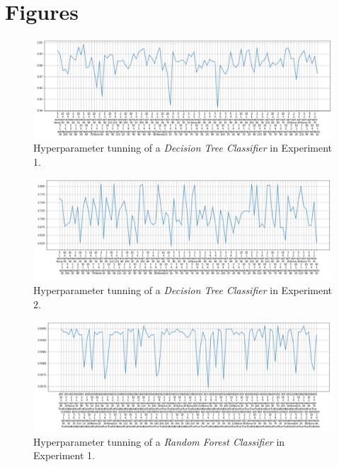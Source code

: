 \documentclass[sigplan,screen]{acmart}
\begin{document}
\section{Figures}

\begin{figure}[h]
    \centering
    \includegraphics[width=\linewidth]{reports/figures/decision_tree_1.png}
    \caption{Hyperparameter tunning of a \emph{Decision Tree Classifier} in Experiment 1.}
    \label{fig:hyp_decision_1}
\end{figure}

\begin{figure}[h]
    \centering
    \includegraphics[width=\linewidth]{reports/figures/decision_tree_2.png}
    \caption{Hyperparameter tunning of a \emph{Decision Tree Classifier} in Experiment 2.}
    \label{fig:hyp_decision_2}
\end{figure}

\begin{figure}[h]
    \centering
    \includegraphics[width=\linewidth]{reports/figures/random_forest_1.png}
    \caption{Hyperparameter tunning of a \emph{Random Forest Classifier} in Experiment 1.}
    \label{fig:hyp_forest_1}
\end{figure}
\end{document}
